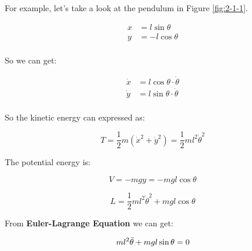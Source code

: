 \documentclass{article}
\theoremstyle{definition}
\theoremstyle{plain}
\theoremstyle{remark}
\begin{document}
For example, let's take a look at the pendulum in Figure \ref{fig:2-1-1}.

\begin{align*}
    x &= l \sin{\theta} \\
    y &= -l \cos{\theta} \\
\end{align*}

So we can get:

\begin{align*}
    \dot{x} &= l \cos{\theta} \cdot \dot{\theta} \\
    \dot{y} &= l \sin{\theta} \cdot \dot{\theta} \\
\end{align*}

So the kinetic energy can expressed as:

\[
    T=\frac{1}{2} m \left(\dot{x}^2+\dot{y}^2\right) = \frac{1}{2} ml^2\dot{\theta}^2
\]

The potential energy is:

\[
    V=-mgy=-mgl\cos{\theta}
\]

\[
    L=\frac{1}{2}ml^2\dot{\theta}^2+mgl\cos{\theta}
\]

From \textbf{Euler-Lagrange Equation} we can get:

\[
    ml^2\Ddot{\theta}+mgl\sin{\theta}=0
\]
\end{document}
